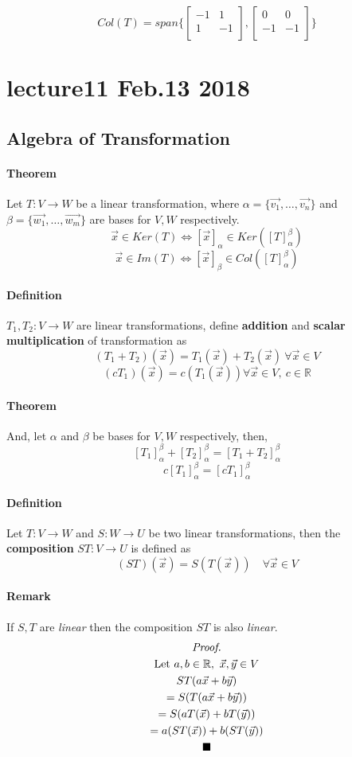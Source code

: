 \documentclass[11pt]{article}
\newcommand{\trans}[3]{{#1}: {#2} \to {#3}}
\newcommand{\R}[0]{\mathbb{R}}
\newcommand{\coor}[2]{[\vec{{#1}}]_{{#2}}}
\newcommand{\tmat}[3]{[{#1}]_{{#2}}^{{#3}}}
\newcommand{\vset}[3]{\{\vec{{#1}_{#2}}, \dots, \vec{{#1}_{#3}}\}}
\newcommand{\definition}[0]{\paragraph{Definition}}
\newcommand{\theorem}[0]{\paragraph{Theorem}}
\begin{document}
	\[
		Col(T) = span \{
		\begin{bmatrix}
			-1 & 1 \\
			1 & -1 \\
		\end{bmatrix},
		\begin{bmatrix}
			0 & 0 \\
			-1 & -1 \\
		\end{bmatrix} \}
	\]
	
	\section{lecture11 Feb.13 2018}
	\subsection{Algebra of Transformation}
	\theorem Let $\trans{T}{V}{W}$ be a linear transformation, where $\alpha = \vset{v}{1}{n}$ and $\beta = \vset{w}{1}{m}$ are bases for $V, W$ respectively.
	\[
		\vec{x} \in Ker(T) \iff \coor{x}{\alpha} \in Ker(\tmat{T}{\alpha}{\beta})
	\]
	\[
		\vec{x} \in Im(T) \iff \coor{x}{\beta} \in Col(\tmat{T}{\alpha}{\beta})
	\]
	
	\definition $\trans{T_1, T_2}{V}{W}$ are linear transformations, define \textbf{addition} and \textbf{scalar multiplication} of transformation as
	\[
		(T_1 + T_2)(\vec{x}) = T_1(\vec{x}) + T_2(\vec{x})\ \forall \vec{x} \in V
	\]
	\[
		(cT_1)(\vec{x}) =c(T_1(\vec{x})) \forall \vec{x} \in V,\ c \in \R
	\]
	
	\theorem And, let $\alpha$ and $\beta$ be bases for $V, W$ respectively,
	then,
	\[
		\tmat{T_1}{\alpha}{\beta} + \tmat{T_2}{\alpha}{\beta} = \tmat{T_1 + T_2}{\alpha}{\beta}
	\]
	\[
		c\tmat{T_1}{\alpha}{\beta} = \tmat{cT_1}{\alpha}{\beta}
	\]
	
	\definition Let $\trans{T}{V}{W}$ and $\trans{S}{W}{U}$ be two linear transformations, then the \textbf{composition} $\trans{ST}{V}{U}$ is defined as
	\[
		(ST)(\vec{x}) = S(T(\vec{x}))\quad \forall \vec{x} \in V
	\]
	
	\paragraph{Remark} If $S, T$ are \emph{linear} then the composition $ST$ is also \emph{linear}.
	\begin{multline*}
		\emph{Proof.} \\
		\text{Let } a,b \in \R,\ \vec{x},\vec{y} \in V \\
		ST(a\vec{x} + b\vec{y}) \\
		= S(T(a\vec{x} + b\vec{y})) \\
		= S(aT(\vec{x}) + bT(\vec{y})) \\
		= a(ST(\vec{x})) + b(ST(\vec{y})) \\
		\blacksquare
	\end{multline*}
	
\end{document}
